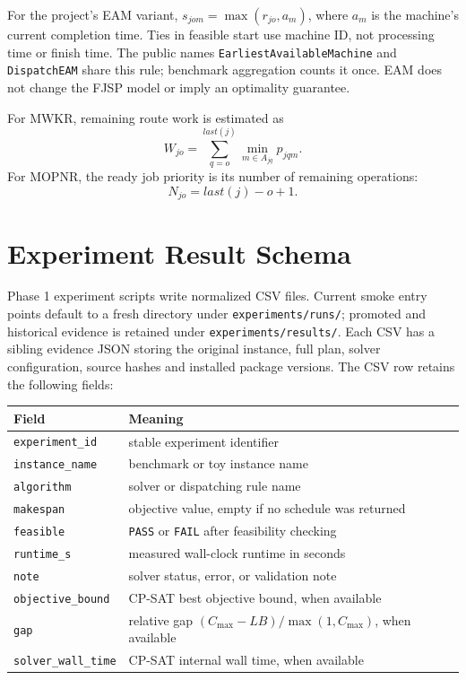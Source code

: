 ﻿\documentclass[11pt]{article}
\begin{document}
For the project's EAM variant, $s_{jom}=\max(r_{jo},a_m)$, where $a_m$
is the machine's current completion time. Ties in feasible start use machine
ID, not processing time or finish time. The public names
\texttt{EarliestAvailableMachine} and \texttt{DispatchEAM} share this rule;
benchmark aggregation counts it once. EAM does not change the FJSP model
or imply an optimality guarantee.

For MWKR, remaining route work is estimated as
\[
W_{jo} = \sum_{q=o}^{last(j)} \min_{m \in A_{jq}} p_{jqm}.
\]
For MOPNR, the ready job priority is its number of remaining operations:
\[
N_{jo} = last(j) - o + 1.
\]

\section{Experiment Result Schema}

Phase 1 experiment scripts write normalized CSV files. Current smoke entry
points default to a fresh directory under \texttt{experiments/runs/}; promoted
and historical evidence is retained under \texttt{experiments/results/}.
Each CSV has a sibling evidence JSON storing the original instance, full plan,
solver configuration, source hashes and installed package versions. The CSV
row retains the following fields:

\begin{table}[h]
\centering
\begin{tabular}{ll}
\toprule
Field & Meaning \\
\midrule
\texttt{experiment\_id} & stable experiment identifier \\
\texttt{instance\_name} & benchmark or toy instance name \\
\texttt{algorithm} & solver or dispatching rule name \\
\texttt{makespan} & objective value, empty if no schedule was returned \\
\texttt{feasible} & \texttt{PASS} or \texttt{FAIL} after feasibility checking \\
\texttt{runtime\_s} & measured wall-clock runtime in seconds \\
\texttt{note} & solver status, error, or validation note \\
\texttt{objective\_bound} & CP-SAT best objective bound, when available \\
\texttt{gap} & relative gap $(C_{\max}-LB)/\max(1,C_{\max})$, when available \\
\texttt{solver\_wall\_time} & CP-SAT internal wall time, when available \\
\bottomrule
\end{tabular}
\end{table}
\end{document}
